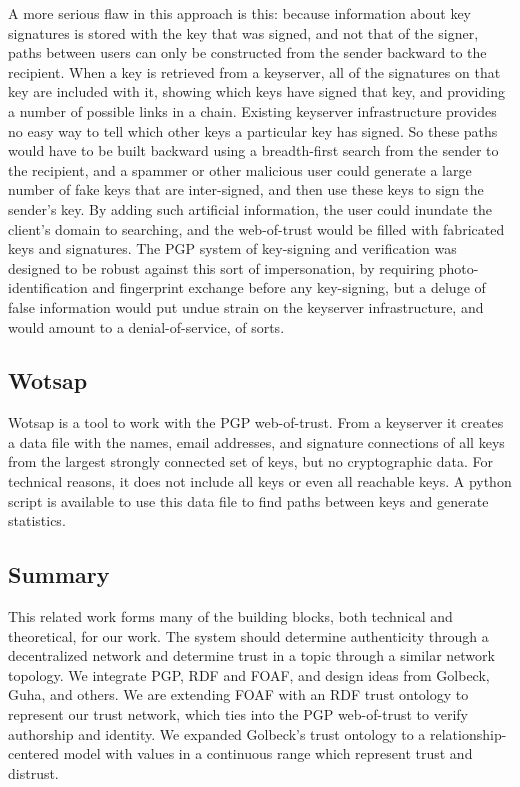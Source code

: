 \documentclass[letterpaper]{www2006-submission}
\begin{document}
A more serious flaw in this approach is this:  because information about key signatures is stored with the key that was signed, and not that of the signer, paths between users can only be constructed from the sender backward to the recipient. When a key is retrieved from a keyserver, all of the signatures on that key are included with it, showing which keys have signed that key, and providing a number of possible links in a chain.  Existing keyserver infrastructure provides no easy way to tell which other keys a particular key has signed.  So these paths would have to be built backward using a breadth-first search from the sender to the recipient, and a spammer or other malicious user could generate a large number of fake keys that are inter-signed, and then use these keys to sign the sender's key. By adding such artificial information, the user could inundate the client's domain to searching, and the web-of-trust would be filled with fabricated keys and signatures. The PGP system of key-signing and verification was designed to be robust against this sort of impersonation, by requiring photo-identification and fingerprint exchange before any key-signing, but a deluge of false information would put undue strain on the keyserver infrastructure, and would amount to a denial-of-service, of sorts.

\subsection{Wotsap}
\label{wotsap}
Wotsap \citep{wotsap} is a tool to work with the PGP web-of-trust.  From a keyserver it creates a data file with the names, email addresses, and signature connections of all keys from the largest strongly connected set of keys, but no cryptographic data.  For technical reasons, it does not include all keys or even all reachable keys.  A python script is available to use this data file to find paths between keys and generate statistics.

\subsection{Summary}
This related work forms many of the building blocks, both technical and theoretical, for our work.  The system should determine authenticity through a decentralized network and determine trust in a topic through a similar network topology.  We integrate PGP, RDF and FOAF, and design ideas from Golbeck, Guha, and others.  We are extending FOAF with an RDF trust ontology to represent our trust network, which ties into the PGP web-of-trust to verify authorship and identity.  We expanded Golbeck's trust ontology to a relationship-centered model with values in a continuous range which represent trust and distrust.
\end{document}
